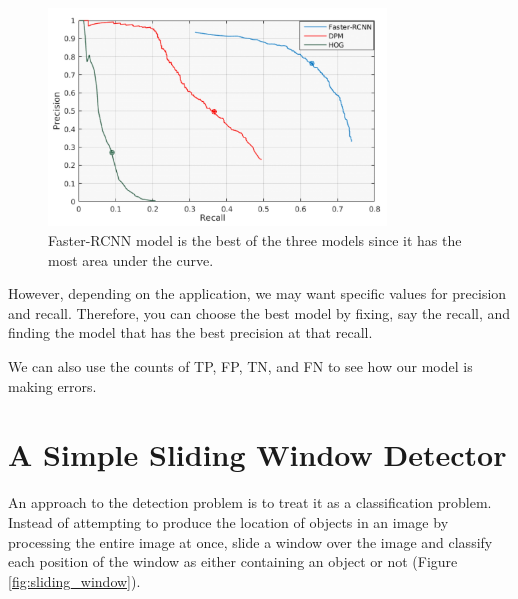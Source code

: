 \documentclass{article}
\begin{document}
\begin{figure}[ht]
\centering
	\includegraphics[width=0.8\textwidth]{precision_recall.jpg}
    \caption{Faster-RCNN model is the best of the three models since it has the most area under the curve.}
\end{figure}

However, depending on the application, we may want specific values for precision and recall. Therefore, you can choose the best model by fixing, say the recall, and finding the model that has the best precision at that recall.

We can also use the counts of TP, FP, TN, and FN to see how our model is making errors.


\section{A Simple Sliding Window Detector}
An approach to the detection problem is to treat it as a classification problem. Instead of attempting to produce the location of objects in an image by processing the entire image at once, slide a window over the image and classify each position of the window as either containing an object or not (Figure \ref{fig:sliding_window}).
\end{document}
